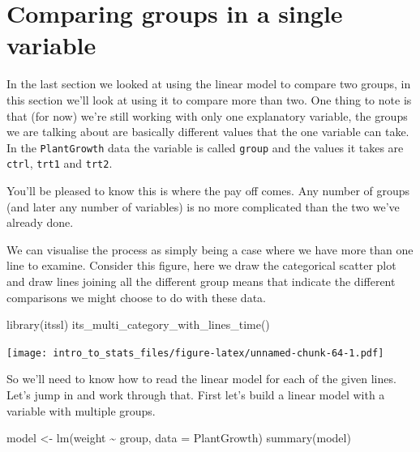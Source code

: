 \documentclass[
]{book}
\newenvironment{Shaded}{\begin{snugshade}}{\end{snugshade}}
\newcommand{\AttributeTok}[1]{\textcolor[rgb]{0.77,0.63,0.00}{#1}}
\newcommand{\FunctionTok}[1]{\textcolor[rgb]{0.00,0.00,0.00}{#1}}
\newcommand{\NormalTok}[1]{#1}
\newcommand{\OtherTok}[1]{\textcolor[rgb]{0.56,0.35,0.01}{#1}}
\newcommand{\SpecialCharTok}[1]{\textcolor[rgb]{0.00,0.00,0.00}{#1}}
\begin{document}
\hypertarget{comparing-groups-in-a-single-variable}{%
\section{Comparing groups in a single variable}\label{comparing-groups-in-a-single-variable}}

In the last section we looked at using the linear model to compare two groups, in this section we'll look at using it to compare more than two. One thing to note is that (for now) we're still working with only one explanatory variable, the groups we are talking about are basically different values that the one variable can take. In the \texttt{PlantGrowth} data the variable is called \texttt{group} and the values it takes are \texttt{ctrl}, \texttt{trt1} and \texttt{trt2}.

You'll be pleased to know this is where the pay off comes. Any number of groups (and later any number of variables) is no more complicated than the two we've already done.

We can visualise the process as simply being a case where we have more than one line to examine. Consider this figure, here we draw the categorical scatter plot and draw lines joining all the different group means that indicate the different comparisons we might choose to do with these data.

\begin{Shaded}
\begin{Highlighting}[]
\FunctionTok{library}\NormalTok{(itssl)}
\FunctionTok{its\_multi\_category\_with\_lines\_time}\NormalTok{()}
\end{Highlighting}
\end{Shaded}

\texttt{[image: intro\_to\_stats\_files/figure-latex/unnamed-chunk-64-1.pdf]}

So we'll need to know how to read the linear model for each of the given lines.
Let's jump in and work through that. First let's build a linear model with a variable with multiple groups.

\begin{Shaded}
\begin{Highlighting}[]
\NormalTok{model }\OtherTok{\textless{}{-}} \FunctionTok{lm}\NormalTok{(weight }\SpecialCharTok{\textasciitilde{}}\NormalTok{ group, }\AttributeTok{data =}\NormalTok{ PlantGrowth)}
\FunctionTok{summary}\NormalTok{(model)}
\end{Highlighting}
\end{Shaded}
\end{document}
